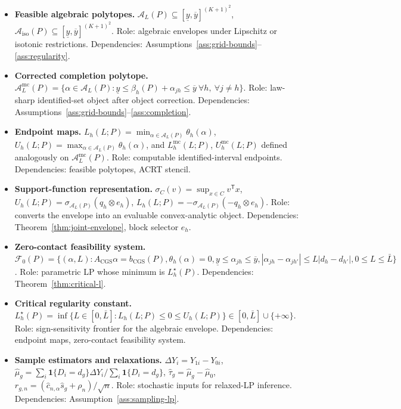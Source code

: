 \documentclass[11pt]{article}
\newcommand{\one}{\mathbf{1}}
\newcommand{\transpose}{\mathsf{T}}
\theoremstyle{definition}
\theoremstyle{plain}
\theoremstyle{remark}
\begin{document}
\begin{itemize}[leftmargin=*]
  \item \textbf{Feasible algebraic polytopes.} \(\mathcal A_L(P)\subseteq[\underline y,\overline y]^{(K+1)^2}\), \(\mathcal A_{\mathrm{iso}}(P)\subseteq[\underline y,\overline y]^{(K+1)^2}\).  Role: algebraic envelopes under Lipschitz or isotonic restrictions.  Dependencies: Assumptions~\ref{ass:grid-bounds}--\ref{ass:regularity}.
  \item \textbf{Corrected completion polytope.} \(\mathcal A_L^{\mathrm{mc}}(P)=\{\alpha\in\mathcal A_L(P):\underline y\le \beta_h(P)+\alpha_{jh}\le\overline y\ \forall h,\ \forall j\ne h\}\).  Role: law-sharp identified-set object after object correction.  Dependencies: Assumptions~\ref{ass:grid-bounds}--\ref{ass:completion}.
  \item \textbf{Endpoint maps.} \(L_h(L;P)=\min_{\alpha\in\mathcal A_L(P)}\theta_h(\alpha)\), \(U_h(L;P)=\max_{\alpha\in\mathcal A_L(P)}\theta_h(\alpha)\), and \(L_h^{\mathrm{mc}}(L;P)\), \(U_h^{\mathrm{mc}}(L;P)\) defined analogously on \(\mathcal A_L^{\mathrm{mc}}(P)\).  Role: computable identified-interval endpoints.  Dependencies: feasible polytopes, ACRT stencil.
  \item \textbf{Support-function representation.} \(\sigma_C(v)=\sup_{x\in C}v^\transpose x\), \(U_h(L;P)=\sigma_{\mathcal A_L(P)}(q_h\otimes e_h)\), \(L_h(L;P)=-\sigma_{\mathcal A_L(P)}(-q_h\otimes e_h)\).  Role: converts the envelope into an evaluable convex-analytic object.  Dependencies: Theorem~\ref{thm:joint-envelope}, block selector \(e_h\).
  \item \textbf{Zero-contact feasibility system.} \(\mathcal F_0(P)=\{(\alpha,L):A_{\mathrm{CGS}}\alpha=b_{\mathrm{CGS}}(P),\theta_h(\alpha)=0,\underline y\le\alpha_{jh}\le\overline y,|\alpha_{jh}-\alpha_{jh'}|\le L|d_h-d_{h'}|,0\le L\le\bar L\}\).  Role: parametric LP whose minimum is \(L_h^\star(P)\).  Dependencies: Theorem~\ref{thm:critical-l}.
  \item \textbf{Critical regularity constant.} \(L_h^\star(P)=\inf\{L\in[0,\bar L]:L_h(L;P)\le0\le U_h(L;P)\}\in[0,\bar L]\cup\{+\infty\}\).  Role: sign-sensitivity frontier for the algebraic envelope.  Dependencies: endpoint maps, zero-contact feasibility system.
  \item \textbf{Sample estimators and relaxations.} \(\Delta Y_i=Y_{1i}-Y_{0i}\), \(\widehat\mu_g=\sum_i\one\{D_i=d_g\}\Delta Y_i/\sum_i\one\{D_i=d_g\}\), \(\widehat\tau_g=\widehat\mu_g-\widehat\mu_0\), \(r_{g,n}=(\widehat c_{n,\alpha}\widehat s_g+\rho_n)/\sqrt n\).  Role: stochastic inputs for relaxed-LP inference.  Dependencies: Assumption~\ref{ass:sampling-lp}.

\end{itemize}
\end{document}
